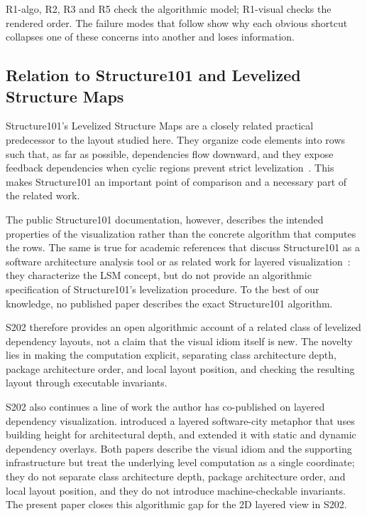 \documentclass[a4paper,twoside]{article}
\begin{document}
R1-algo, R2, R3 and R5 check the algorithmic model; R1-visual checks the
rendered order. The failure modes that follow show why each obvious shortcut
collapses one of these concerns into another and loses information.

\subsection*{Relation to Structure101 and Levelized Structure Maps}

Structure101's Levelized Structure Maps are a closely related practical
predecessor to the layout studied here. They organize code elements into rows
such that, as far as possible, dependencies flow downward, and they expose
feedback dependencies when cyclic regions prevent strict
levelization~\cite{HeadwayLSM,HeadwayMatrix}. This makes Structure101 an
important point of comparison and a necessary part of the related work.

The public Structure101 documentation, however, describes the intended
properties of the visualization rather than the concrete algorithm that computes
the rows. The same is true for academic references that discuss Structure101 as
a software architecture analysis tool or as related work for layered
visualization~\cite{Muccini2012}: they characterize the LSM concept, but do not
provide an algorithmic specification of Structure101's levelization procedure.
To the best of our knowledge, no published paper describes the exact
Structure101 algorithm.

S202 therefore provides an open algorithmic account of a related class of
levelized dependency layouts, not a claim that the visual idiom itself is new.
The novelty lies in making the computation explicit, separating class
architecture depth, package architecture order, and local layout position, and
checking the resulting layout through executable invariants.

S202 also continues a line of work the author has co-published on layered
dependency visualization. \cite{Dashuber2021} introduced a layered software-city
metaphor that uses building height for architectural depth, and \cite{Dashuber2022}
extended it with static and dynamic dependency overlays. Both papers describe
the visual idiom and the supporting infrastructure but treat the underlying
level computation as a single coordinate; they do not separate class
architecture depth, package architecture order, and local layout position, and
they do not introduce machine-checkable invariants. The present paper closes
this algorithmic gap for the 2D layered view in S202.
\end{document}

